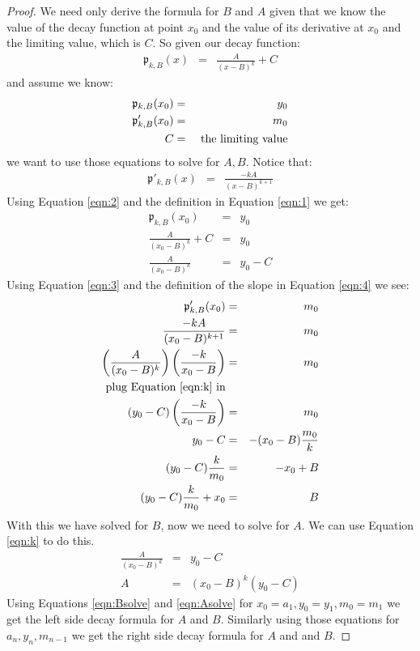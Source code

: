 \documentclass[10pt]{article}
\begin{document}
\begin{proof}
We need only derive the formula for $B$ and $A$ given that we know the value
of the decay function at point $x_0$ and the value of its derivative
at $x_0$ and the limiting value, which is $C$.  So given our decay function:
\begin{eqnarray}
\label{eqn:1}
\mathfrak{p}_{k,B}(x)&=&\frac{A}{(x-B)^k} + C
\end{eqnarray}
and assume we know:
\begin{eqnarray}
\label{eqn:2}\mathfrak{p}_{k,B}(x_0)&=&y_0 \\
\label{eqn:3}\mathfrak{p}'_{k,B}(x_0)&=&m_0 \\
C&=&\hbox{ the limiting value}
\end{eqnarray}
we want to use those equations to solve for $A, B$. Notice that:
\begin{eqnarray}
\label{eqn:4}\mathfrak{p}'_{k,B}(x) &=& \frac{-kA}{(x-B)^{k+1}}
\end{eqnarray}
Using Equation \ref{eqn:2} and the definition in Equation \ref{eqn:1} we get:
\begin{eqnarray}
\mathfrak{p}_{k,B}(x_0)&=&y_0 \\
\frac{A}{(x_0-B)^k} +C &=& y_0 \\ \label{eqn:k}
\frac{A}{(x_0-B)^k} &=& y_0 - C
\end{eqnarray}
Using Equation \ref{eqn:3} and the definition of the slope in Equation
\ref{eqn:4} we see:
\begin{eqnarray}
\mathfrak{p}'_{k,B}(x_0)&=&m_0 \\
\frac{-kA}{(x_0-B)^{k+1}}&=&m_0 \\
\left(\frac{A}{(x_0-B)^{k}}\right) \left( \frac{-k}{x_0-B} \right) &=&m_0 \\
\hbox{plug Equation \ref{eqn:k} in} \\
\left(y_0-C\right)\left( \frac{-k}{x_0-B} \right) &=& m_0 \\
y_0-C &=& -(x_0-B)\frac{m_0}{k} \\
(y_0-C)\frac{k}{m_0}&=&-x_0+B \\
\label{eqn:Bsolve}(y_0-C)\frac{k}{m_0}+x_0&=&B
\end{eqnarray}
With this we have solved for $B$, now we need to solve for $A$.  We can use
Equation \ref{eqn:k} to do this.
\begin{eqnarray}
\frac{A}{(x_0-B)^k} &=& y_0 - C \\
\label{eqn:Asolve} A &=& (x_0-B)^k(y_0-C)
\end{eqnarray}
Using Equations \ref{eqn:Bsolve} and \ref{eqn:Asolve} for $x_0=a_1, y_0=y_1, m_0=m_1$ we
get the left side decay formula for $A$ and $B$.  Similarly using those equations for
$a_n, y_n, m_{n-1}$ we get the right side decay formula for $A$ and and $B$.
\end{proof}
\end{document}
